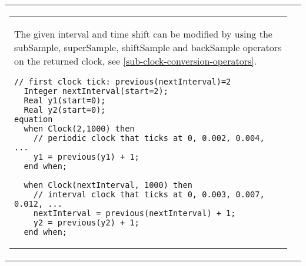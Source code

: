 \begin{longtable}[]{|p{3cm}|p{12cm}|}
\begin{tabular}{@{}p{119mm}@{}}
\begin{nonnormative}
The given interval and time shift can be modified by using the subSample, superSample, shiftSample and backSample operators on the returned clock, see \cref{sub-clock-conversion-operators}.
\end{nonnormative}

\begin{example}
\begin{lstlisting}[language=modelica]
  // first clock tick: previous(nextInterval)=2
  Integer nextInterval(start=2);
  Real y1(start=0);
  Real y2(start=0);
equation
  when Clock(2,1000) then
    // periodic clock that ticks at 0, 0.002, 0.004, ...
    y1 = previous(y1) + 1;
  end when;

  when Clock(nextInterval, 1000) then
    // interval clock that ticks at 0, 0.003, 0.007, 0.012, ...
    nextInterval = previous(nextInterval) + 1;
    y2 = previous(y2) + 1;
  end when;
\end{lstlisting}
\end{example}


\end{tabular}
\end{longtable}
